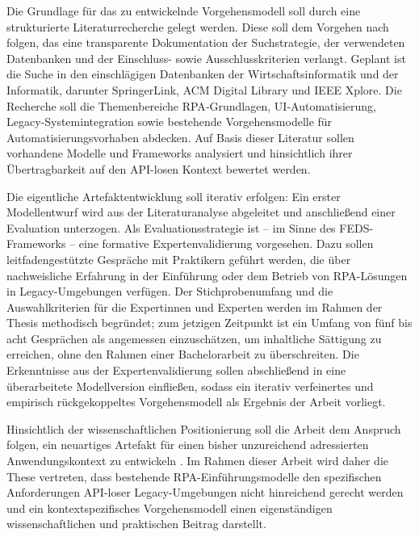 Die Grundlage für das zu entwickelnde Vorgehensmodell soll durch eine strukturierte
Literaturrecherche gelegt werden. Diese soll dem Vorgehen nach \textcite{VomBrocke2009}
folgen, das eine transparente Dokumentation der Suchstrategie, der verwendeten Datenbanken
und der Einschluss- sowie Ausschlusskriterien verlangt. Geplant ist die Suche in den
einschlägigen Datenbanken der Wirtschaftsinformatik und der Informatik, darunter SpringerLink,
\acs{ACM} Digital Library und \acs{IEEE} Xplore. Die Recherche soll die Themenbereiche \acs{RPA}-Grundlagen,
\acs{UI}-Automatisierung, Legacy-Systemintegration sowie bestehende Vorgehensmodelle für
Automatisierungsvorhaben abdecken. Auf Basis dieser Literatur sollen vorhandene Modelle und
Frameworks analysiert und hinsichtlich ihrer Übertragbarkeit auf den \acs{API}-losen Kontext
bewertet werden.

Die eigentliche Artefaktentwicklung soll iterativ erfolgen: Ein erster Modellentwurf wird aus
der Literaturanalyse abgeleitet und anschließend einer Evaluation unterzogen. Als
Evaluationsstrategie ist -- im Sinne des \acs{FEDS}-Frameworks \autocite[Vgl.][S.~77]{VenableEtAl2016} --
eine formative Expertenvalidierung vorgesehen. Dazu sollen leitfadengestützte Gespräche mit
Praktikern geführt werden, die über nachweisliche Erfahrung in der Einführung oder dem Betrieb
von \acs{RPA}-Lösungen in Legacy-Umgebungen verfügen.
Der Stichprobenumfang und die Auswahlkriterien für die Expertinnen und Experten werden im
Rahmen der Thesis methodisch begründet; zum jetzigen Zeitpunkt ist ein Umfang von fünf bis
acht Gesprächen als angemessen einzuschätzen, um inhaltliche Sättigung zu erreichen, ohne
den Rahmen einer Bachelorarbeit zu überschreiten. Die Erkenntnisse aus der Expertenvalidierung
sollen abschließend in eine überarbeitete Modellversion einfließen, sodass ein iterativ
verfeinertes und empirisch rückgekoppeltes Vorgehensmodell als Ergebnis der Arbeit vorliegt.

Hinsichtlich der wissenschaftlichen Positionierung soll die Arbeit dem Anspruch folgen,
ein neuartiges Artefakt für einen bisher unzureichend adressierten Anwendungskontext zu
entwickeln \autocite[Vgl.][S.~337]{GregorHevner2013}. Im Rahmen dieser Arbeit wird daher die These
vertreten, dass bestehende \acs{RPA}-Einführungsmodelle den spezifischen Anforderungen
\acs{API}-loser Legacy-Umgebungen nicht hinreichend gerecht werden und ein kontextspezifisches
Vorgehensmodell einen eigenständigen wissenschaftlichen und praktischen Beitrag darstellt.





